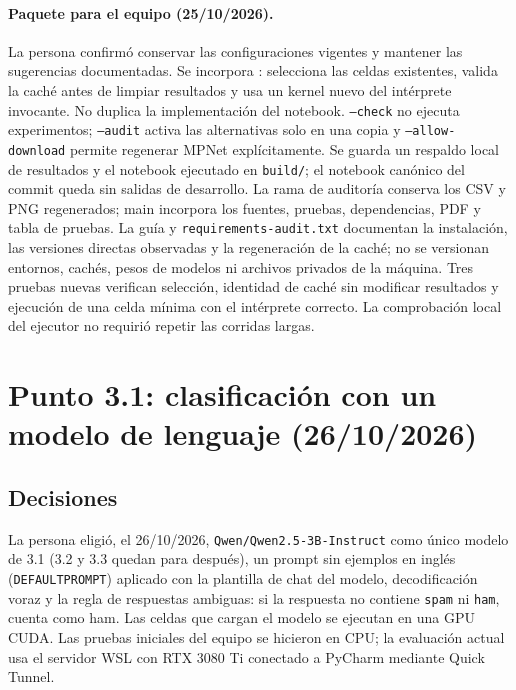 \documentclass[11pt,letterpaper]{article}
\renewcommand{\_}{\originalunderscore\allowbreak}
\begin{document}
\paragraph{Paquete para el equipo (25/10/2026).}
La persona confirmó conservar las configuraciones vigentes y mantener las
sugerencias documentadas. Se incorpora
: selecciona las celdas existentes, valida la
caché antes de limpiar resultados y usa un kernel nuevo del intérprete
invocante. No duplica la implementación del notebook. \texttt{--check}
no ejecuta experimentos; \texttt{--audit} activa las alternativas solo en
una copia y \texttt{--allow-download} permite regenerar MPNet explícitamente.
Se guarda un respaldo local de resultados y el notebook ejecutado en
\texttt{build/}; el notebook canónico del commit queda sin salidas de
 desarrollo. La rama de auditoría conserva los CSV y PNG regenerados;
main incorpora los fuentes, pruebas, dependencias, PDF y tabla de pruebas.
La guía  y
\texttt{requirements-audit.txt} documentan la instalación, las versiones
directas observadas y la regeneración de la caché; no se versionan
entornos, cachés, pesos de modelos ni archivos privados de la máquina.
Tres pruebas nuevas verifican selección, identidad de caché sin modificar
resultados y ejecución de una celda mínima con el intérprete correcto.
La comprobación local del ejecutor no requirió repetir las corridas largas.

\section{Punto 3.1: clasificación con un modelo de lenguaje (26/10/2026)}

\subsection{Decisiones}
La persona eligió, el 26/10/2026, \texttt{Qwen/Qwen2.5-3B-Instruct} como
único modelo de 3.1 (3.2 y 3.3 quedan para después), un prompt sin ejemplos
en inglés (\texttt{DEFAULT\_PROMPT}) aplicado con la plantilla de chat del
modelo, decodificación voraz y la regla de respuestas ambiguas: si la
respuesta no contiene \texttt{spam} ni \texttt{ham}, cuenta como ham. Las
celdas que cargan el modelo se ejecutan en una GPU CUDA. Las pruebas iniciales
del equipo se hicieron en CPU; la evaluación actual usa el servidor WSL con
RTX 3080 Ti conectado a PyCharm mediante Quick Tunnel.
\end{document}

